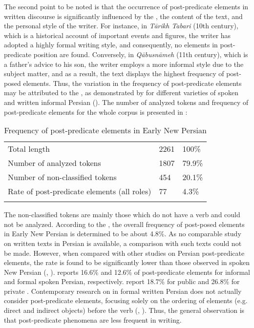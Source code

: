 \documentclass[output=paper,colorlinks,citecolor=brown,draftmode]{langscibook}
\begin{document}
The second point to be noted is that the occurrence of post-predicate elements in written discourse is significantly influenced by the , the content of the text, and the personal style of the writer. For instance, in \textit{Tārikh Tabari} (10th century), which is a historical account of important events and figures, the writer has adopted a highly formal writing style, and consequently, no elements in post-predicate position are found. Conversely, in \textit{Qābusnāmeh} (11th century), which is a father's advice to his son, the writer employs a more informal style due to the subject matter, and as a result, the text displays the highest frequency of post-posed elements. Thus, the variation in the frequency of post-predicate elements may be attributed to the , as demonstrated by \citet{frommer_post-verbal_1981} for different varieties of spoken and written informal Persian (). The number of analyzed tokens and frequency of post-predicate elements for the whole corpus is presented in :

\begin{table}
 \begin{tabularx}{\textwidth}{lYY}
 \lsptoprule
Total length & 2261 & 100\% \\
Number of analyzed tokens & 1807 & 79.9\% \\
Number of non-classified tokens & 454 & 20.1\% \\
Rate of post-predicate elements (all roles) & 77 & 4.3\% \\
\lspbottomrule
 \end{tabularx}
 \caption{Frequency of post-predicate elements in Early New Persian}
 \label{ENP:tab:2}
\end{table}

The non-classified tokens are mainly those which do not have a verb and could not be analyzed. According to the , the overall frequency of post-posed elements in Early New Persian is determined to be about 4.8\%. As no comparable study on written texts in Persian is available, a comparison with such texts could not be made. However, when compared with other studies on Persian post-predicate elements, the rate is found to be significantly lower than those observed in spoken New Persian (\citealt{frommer_post-verbal_1981}, ). \citet{frommer_post-verbal_1981} reports 16.6\% and 12.6\% of post-predicate elements for informal and formal spoken Persian, respectively.  report 18.7\% for public  and 26.8\% for private . Contemporary research on  in formal written Persian does not actually consider post-predicate elements, focusing solely on the ordering of elements (e.g. direct and indirect objects) before the verb (\citealt{FaghiriSamvelian2014Accesibility}, \citealt{FaghiriSamvelian2020SOV}). Thus, the general observation is that post-predicate phenomena are less frequent in writing.
\end{document}
